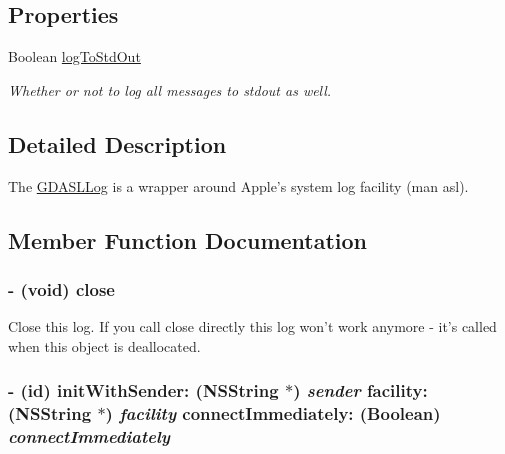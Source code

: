 \subsection*{Properties}
\begin{DoxyCompactItemize}
\item 
\hypertarget{interface_g_d_a_s_l_log_af52ec0d7d7a656c095fc8af8d7035065}{
Boolean \hyperlink{interface_g_d_a_s_l_log_af52ec0d7d7a656c095fc8af8d7035065}{logToStdOut}}
\label{interface_g_d_a_s_l_log_af52ec0d7d7a656c095fc8af8d7035065}

\begin{DoxyCompactList}\small\item\em Whether or not to log all messages to stdout as well. \item\end{DoxyCompactList}\end{DoxyCompactItemize}


\subsection{Detailed Description}
The \hyperlink{interface_g_d_a_s_l_log}{GDASLLog} is a wrapper around Apple's system log facility (man asl). 

\subsection{Member Function Documentation}
\hypertarget{interface_g_d_a_s_l_log_ae49db911364a0162197ad1044126c664}{
\subsubsection[{close}]{\setlength{\rightskip}{0pt plus 5cm}-\/ (void) close }}
\label{interface_g_d_a_s_l_log_ae49db911364a0162197ad1044126c664}


Close this log. If you call close directly this log won't work anymore -\/ it's called when this object is deallocated. \hypertarget{interface_g_d_a_s_l_log_ac9553b0e41554a4d75a35f6bd5280956}{
\subsubsection[{initWithSender:facility:connectImmediately:}]{\setlength{\rightskip}{0pt plus 5cm}-\/ (id) initWithSender: ({\bf NSString} $\ast$) {\em sender}\/ facility: ({\bf NSString} $\ast$) {\em facility}\/ connectImmediately: (Boolean) {\em connectImmediately}}}
\label{interface_g_d_a_s_l_log_ac9553b0e41554a4d75a35f6bd5280956}


